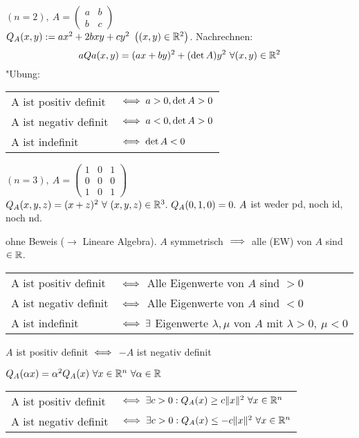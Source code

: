 \documentclass[a4paper,twoside,DIV15,BCOR12mm,chapterprefix=true,headings=twolinechapter]{scrbook}
\begin{document}
\begin{beispiele}
\item $(n=2),\ A=\left(\begin{smallmatrix}a&b\\b&c\end{smallmatrix}\right)$\\
$Q_A(x,y):=ax^2+2bxy+cy^2\ \left((x,y)\in\MdR^2\right)$. Nachrechnen:\\
$$aQa(x,y)=(ax+by)^2+(\det A)y^2\ \forall (x,y)\in\mathbb{R}^2$$ "Ubung:\\
\begin{tabular}{ll}
A ist positiv definit & $\iff a>0, \det A>0$\\
A ist negativ definit & $\iff a<0, \det A>0$\\
A ist indefinit& $\iff \det A<0$
\end{tabular}
\item $(n=3),\ A=\left(\begin{smallmatrix}1&0&1\\0&0&0\\1&0&1\end{smallmatrix}\right)$\\
$Q_A(x,y,z)=(x+z)^2\ \forall\ (x,y,z)\in\MdR^3.\ Q_A(0,1,0)=0.\ A$ ist weder pd, noch id, noch nd.
\item ohne Beweis ($\to$ Lineare Algebra). $A$ symmetrisch $\implies$ alle  (EW) von $A$ sind $\in\mathbb{R}$.\\
\begin{tabular}{ll}
A ist positiv definit & $\iff$ Alle Eigenwerte von $A$ sind $>0$\\
A ist negativ definit & $\iff$ Alle Eigenwerte von $A$ sind $<0$\\
A ist indefinit& $\iff \exists$ Eigenwerte $\lambda, \mu$ von $A$ mit $\lambda>0,\ \mu<0$
\end{tabular}
\end{beispiele}

\begin{satz}
\begin{liste}
\item $A$ ist positiv definit $\iff$ $-A$ ist negativ definit
\item $Q_A(\alpha x)=\alpha^2Q_A(x)\ \forall x\in\mathbb{R}^n\ \forall \alpha\in\mathbb{R}$
\item \begin{tabular}{ll}
A ist positiv definit & $\iff \exists c>0: Q_A(x)\ge c\|x\|^2\ \forall x\in\mathbb{R}^n$\\
A ist negativ definit & $\iff \exists c>0: Q_A(x)\le -c\|x\|^2\ \forall x\in\mathbb{R}^n$
\end{tabular}
\end{liste}
\end{satz}
\end{document}
